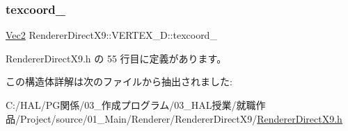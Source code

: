 \mbox{\label{struct_renderer_direct_x9_1_1_v_e_r_t_e_x__3_d_a240251febb14de7b0a6525d3b305f516}} 
\subsubsection{\texorpdfstring{texcoord\+\_\+}{texcoord\_}}
{\footnotesize\ttfamily \mbox{\hyperlink{_vector3_d_8h_a5ef6e95dfc5f9d3820b71772d99bbc25}{Vec2}} Renderer\+Direct\+X9\+::\+V\+E\+R\+T\+E\+X\+\_\+D\+::texcoord\+\_\+}



 Renderer\+Direct\+X9.\+h の 55 行目に定義があります。



この構造体詳解は次のファイルから抽出されました\+:\begin{DoxyCompactItemize}
\item 
C\+:/\+H\+A\+L/\+P\+G関係/03\+\_\+作成プログラム/03\+\_\+\+H\+A\+L授業/就職作品/\+Project/source/01\+\_\+\+Main/\+Renderer/\+Renderer\+Direct\+X9/\mbox{\hyperlink{_renderer_direct_x9_8h}{Renderer\+Direct\+X9.\+h}}\end{DoxyCompactItemize}
